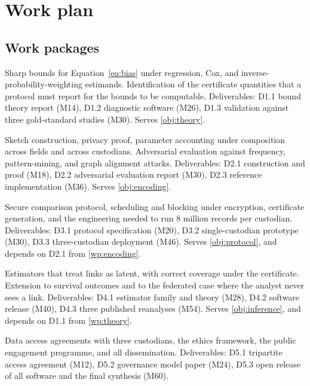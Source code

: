 \section{Work plan}
\label{sec:workplan}

\subsection{Work packages}

Sharp bounds for Equation~\eqref{eq:bias} under regression, Cox, and inverse-probability-weighting
estimands. Identification of the certificate quantities that a protocol must report for the bounds
to be computable. Deliverables: D1.1 bound theory report (M14), D1.2 diagnostic software (M26),
D1.3 validation against three gold-standard studies (M30). Serves \ref{obj:theory}.

Sketch construction, privacy proof, parameter accounting under composition across fields and across
custodians. Adversarial evaluation against frequency, pattern-mining, and graph alignment attacks.
Deliverables: D2.1 construction and proof (M18), D2.2 adversarial evaluation report (M30),
D2.3 reference implementation (M36). Serves \ref{obj:encoding}.

Secure comparison protocol, scheduling and blocking under encryption, certificate generation, and
the engineering needed to run 8 million records per custodian. Deliverables: D3.1 protocol
specification (M20), D3.2 single-custodian prototype (M30), D3.3 three-custodian deployment (M46).
Serves \ref{obj:protocol}, and depends on D2.1 from \ref{wp:encoding}.

Estimators that treat links as latent, with correct coverage under the certificate. Extension to
survival outcomes and to the federated case where the analyst never sees a link. Deliverables:
D4.1 estimator family and theory (M28), D4.2 software release (M40), D4.3 three published
reanalyses (M54). Serves \ref{obj:inference}, and depends on D1.1 from \ref{wp:theory}.

Data access agreements with three custodians, the ethics framework, the public engagement
programme, and all dissemination. Deliverables: D5.1 tripartite access agreement (M12),
D5.2 governance model paper (M24), D5.3 open release of all software and the final synthesis (M60).

